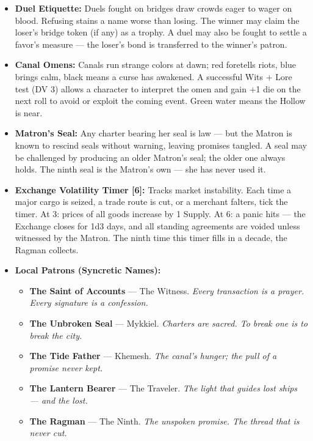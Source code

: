 \begin{itemize}
\begin{enumerate}
    \item \textbf{Stone Bond:} The patron is a patrician (Contarini, Morosini, Dandolo). The client holds a charter or a seal. The promise is public but the measure is private.
    \item \textbf{Bridge Bond:} The patron and client met on a bridge at night. The favor was sworn without witnesses. Only the water remembers.
    \item \textbf{Ninth Bond:} The patron is the Hollow. The client does not know they are bound. The ninth thread is already tied.
  \end{enumerate}
\item \textbf{Duel Etiquette:} Duels fought on bridges draw crowds eager to wager on blood. Refusing stains a name worse than losing. The winner may claim the loser's bridge token (if any) as a trophy. A duel may also be fought to settle a favor's measure --- the loser's bond is transferred to the winner's patron.
\item \textbf{Canal Omens:} Canals run strange colors at dawn; red foretells riots, blue brings calm, black means a curse has awakened. A successful Wits + Lore test (DV 3) allows a character to interpret the omen and gain +1 die on the next roll to avoid or exploit the coming event. Green water means the Hollow is near.
\item \textbf{Matron's Seal:} Any charter bearing her seal is law --- but the Matron is known to rescind seals without warning, leaving promises tangled. A seal may be challenged by producing an older Matron's seal; the older one always holds. The ninth seal is the Matron's own --- she has never used it.
\item \textbf{Exchange Volatility Timer [6]:} Tracks market instability. Each time a major cargo is seized, a trade route is cut, or a merchant falters, tick the timer. At 3: prices of all goods increase by 1 Supply. At 6: a panic hits --- the Exchange closes for 1d3 days, and all standing agreements are voided unless witnessed by the Matron. The ninth time this timer fills in a decade, the Ragman collects.
\item \textbf{Local Patrons (Syncretic Names):}
  \begin{itemize}
    \item \textbf{The Saint of Accounts} --- The Witness. \textit{Every transaction is a prayer. Every signature is a confession.}
    \item \textbf{The Unbroken Seal} --- Mykkiel. \textit{Charters are sacred. To break one is to break the city.}
    \item \textbf{The Tide Father} --- Khemesh. \textit{The canal's hunger; the pull of a promise never kept.}
    \item \textbf{The Lantern Bearer} --- The Traveler. \textit{The light that guides lost ships --- and the lost.}
    \item \textbf{The Ragman} --- The Ninth. \textit{The unspoken promise. The thread that is never cut.}
  \end{itemize}
\end{itemize}

